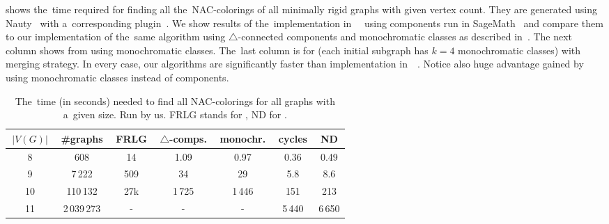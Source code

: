shows the~time required for finding all the~NAC-colorings
of all minimally rigid graphs with given vertex count.
%
They are generated using Nauty~\cite{nauty}
with a~corresponding plugin~\cite{nauty_plugin}.
%
We show results of the~implementation
in~\flexrilog{}~\cite{flexrilog} using \trcon{} components
run in SageMath~\cite{sagemath}
and compare them to our implementation of the~same \Naive{} algorithm
using $\triangle$-connected components
and monochromatic classes as described in~.
The next column shows \NaiveCycles{} from 
using monochromatic classes.
The~last column is for \NeighborsDegree{} (each initial subgraph has $k=4$ monochromatic classes)
with \MergeLinear{} merging strategy.
%
In every case, our algorithms are significantly faster than implementation in~\flexrilog{}~\cite{flexrilog}.
Notice also huge advantage gained by using monochromatic classes instead of \trcon{} components.
%
\begin{table}[ht]
	\caption[Running times on graphs]{
		The~time (in seconds) needed to find all NAC-colorings for all graphs with a~given size. Run by us.
		\textsc{FRLG} stands for \flexrilog{}, \textsc{ND} for \NeighborsDegree{}.}%
	\label{tab:all_min_rigid}
	\centering
	\begin{tabular}{ccccccc}
		\hline
		\,$|V(G)|$\, & \,\#graphs\, & \,FRLG\, & \,$\triangle$-comps.\, & \,monochr.\, & \,cycles\, & \,\textsc{ND}\, \\
		\hline
		8            & 608          & 14       & 1.09                   & 0.97         & 0.36       & 0.49            \\
		9            & 7\,222       & 509      & 34                     & 29           & 5.8        & 8.6             \\
		10           & 110\,132     & 27k      & 1\,725                 & 1\,446       & 151        & 213             \\
		11           & 2\,039\,273  & -        & -                      & -            & 5\,440     & 6\,650          \\
		\hline
	\end{tabular}
\end{table}

